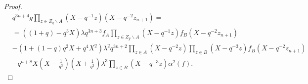 \documentclass[10pt,a4paper]{amsart}
\begin{document}
\begin{proof}






\begin{equation}\label{***}
\begin{split}
&q^{3n+4}g \prod_{z\in Z_g\backslash A}(X-q^{-1}z)(X-q^{-2}z_{n+1})=\\
&=\left((1+q)-q^3X\right)\lambda q^{3n+3}f_A\prod_{z\in Z_g\backslash A}(X-q^{-1}z)f_B(X-q^{-2}z_{n+1})\\
&-\left(1+(1-q)q^2X+q^4X^2\right)\lambda^2q^{3n+2}\prod_{z\in A}(X-q^{-2}z)\prod_{z\in B}(X-q^{-3}z)f_B(X-q^{-2}z_{n+1})\\
&-q^{n+8}X(X-\frac{1}{q^3})(X+\frac{1}{q^3})\lambda^3\prod_{z\in B}(X-q^{-3}z)\alpha^2(f).
\end{split}
\end{equation}



\end{proof}
\end{document}
